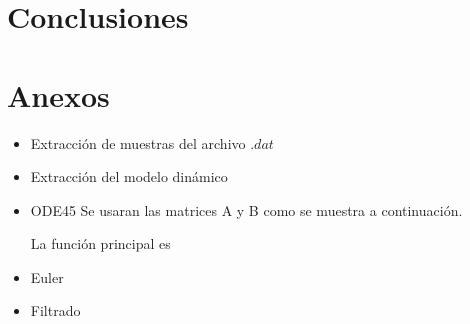 \documentclass[12pt]{article}
\begin{document}
\section{Conclusiones}
\section{Anexos}
\begin{itemize}
    \item Extracción de muestras del archivo $.dat$
    
    \item Extracción del modelo dinámico 
    
    \item ODE45
    Se usaran las matrices A y B como se muestra a continuación.
    
    La función principal es
    
    \item Euler
    
    \item Filtrado
    
\end{itemize}


\end{document}
